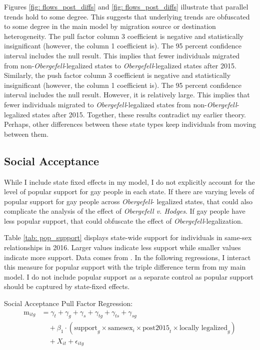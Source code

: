 \documentclass[12pt,letterpaper]{article}
\begin{document}
Figures \ref{fig: flows_post_diffs} and \ref{fig: flows_post_diffs} illustrate that parallel trends hold to some degree. This suggests that underlying trends are obfuscated to some degree in the main model by migration source or destination heterogeneity. The pull factor column 3 coefficient is negative and statistically insignificant (however, the column 1 coefficient is). The 95 percent confidence interval includes the null result. This implies that fewer individuals migrated from non-\textit{Obergefell}-legalized states to \textit{Obergefell}-legalized states after 2015.  Similarly, the push factor column 3 coefficient is negative and statistically insignificant (however, the column 1 coefficient is). The 95 percent confidence interval includes the null result. However, it is relatively large. This implies that fewer individuals migrated to \textit{Obergefell}-legalized states from non-\textit{Obergefell}-legalized states after 2015. Together, these results contradict my earlier theory. Perhaps, other differences between these state types keep individuals from moving between them.


\FloatBarrier
\subsection{Social Acceptance}

While I include state fixed effects in my model, I do not explicitly account for the level of popular support for gay people in each state. If there are varying levels of popular support for gay people across \textit{Obergefell}- legalized states, that could also complicate the analysis of the effect of \textit{Obergefell v. Hodges}. If gay people have less popular support, that could obfuscate the effect of \textit{Obergefell}-legalization.



Table \ref{tab: pop_support} displays state-wide support for individuals in same-sex relationships in 2016. Larger values indicate less support while smaller values indicate more support. Data comes from \citet{29}. In the following regressions, I interact this measure for popular support with the triple difference term from my main model. I do not include popular support as a separate control as popular support should be captured by state-fixed effects.

\hfill
\break
Social Acceptance Pull Factor Regression:
\begin{equation}
\begin{aligned}
\text{m}_{itg} &= \gamma_t + \gamma_g + \gamma_s + \gamma_{tg} + \gamma_{ts} + \gamma_{sg} \\
&\quad + \beta_1 \cdot (\text{support}_g \times \text{samesex}_i \times \text{post2015}_t \times \text{locally legalized}_g) \\
&\quad + X_{it} + \epsilon_{itg}
\end{aligned}
\end{equation}
\end{document}

